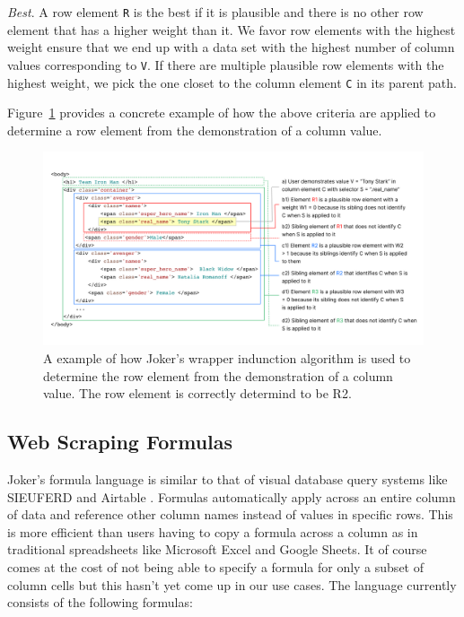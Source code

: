 \documentclass[sigconf,10pt]{acmart}
\begin{document}
\emph{Best}. A row element \texttt{R} is the best if it is plausible and
there is no other row element that has a higher weight than it. We favor
row elements with the highest weight ensure that we end up with a data
set with the highest number of column values corresponding to
\texttt{V}. If there are multiple plausible row elements with the
highest weight, we pick the one closet to the column element \texttt{C}
in its parent path.

Figure~\ref{fig:algorithm} provides a concrete example of how the above
criteria are applied to determine a row element from the demonstration
of a column value.

\begin{figure}
  \includegraphics[width=\textwidth]{media/algorithm.png}
  \caption{\label{fig:algorithm} A example of how Joker's wrapper indunction algorithm is used to determine the row element from the demonstration of a column value. The row element is correctly determind to be R2.}
\end{figure}

\hypertarget{web-scraping-formulas}{%
\subsection{Web Scraping Formulas}\label{web-scraping-formulas}}

Joker's formula language is similar to that of visual database query
systems like SIEUFERD \citep{bakke2016} and Airtable \citep{zotero-228}.
Formulas automatically apply across an entire column of data and
reference other column names instead of values in specific rows. This is
more efficient than users having to copy a formula across a column as in
traditional spreadsheets like Microsoft Excel and Google Sheets. It of
course comes at the cost of not being able to specify a formula for only
a subset of column cells but this hasn't yet come up in our use cases.
The language currently consists of the following formulas:
\end{document}
